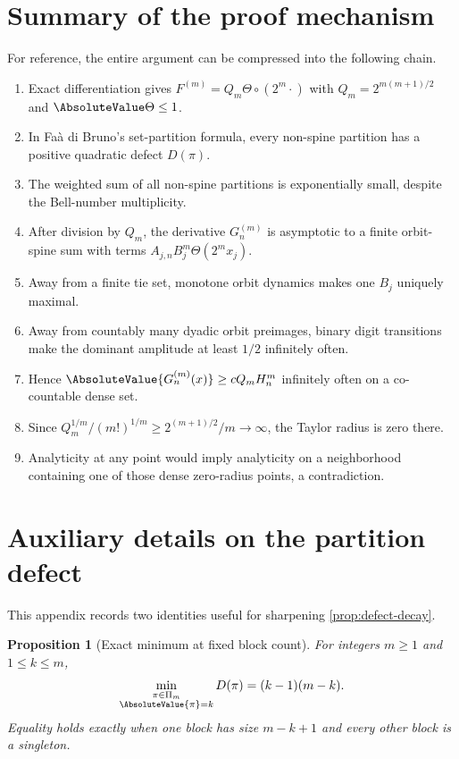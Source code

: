 \documentclass[11pt,oneside]{article}
\newtheorem{proposition}[theorem]{Proposition}
\theoremstyle{definition}
\theoremstyle{remark}
\newcommand{\comp}{\mathbin{\circ}}
\newcommand{\ThetaF}{\Theta}
\begin{document}
\section{Summary of the proof mechanism}

For reference, the entire argument can be compressed into the following chain.
\begin{enumerate}[label=\arabic*.]
 \item Exact differentiation gives $F^{(m)}=Q_m\ThetaF\comp(2^m\cdot)$ with
 $Q_m=2^{m(m+1)/2}$ and $\AbsoluteValue\ThetaF\leq1$.
 \item In Fa\`a di Bruno's set-partition formula, every non-spine partition has a
 positive quadratic defect $D(\pi)$.
 \item The weighted sum of all non-spine partitions is exponentially small, despite
 the Bell-number multiplicity.
 \item After division by $Q_m$, the derivative $G_n^{(m)}$ is asymptotic to a finite
 orbit-spine sum with terms $A_{j,n}B_j^m\ThetaF(2^m x_j)$.
 \item Away from a finite tie set, monotone orbit dynamics makes one $B_j$ uniquely
 maximal.
 \item Away from countably many dyadic orbit preimages, binary digit transitions make
 the dominant amplitude at least $1/2$ infinitely often.
 \item Hence $\AbsoluteValue{G_n^{(m)}(x)}\geq cQ_mH_n^m$ infinitely often on a co-countable
 dense set.
 \item Since $Q_m^{1/m}/(m!)^{1/m}\geq2^{(m+1)/2}/m\to\infty$, the Taylor radius is
 zero there.
 \item Analyticity at any point would imply analyticity on a neighborhood containing
 one of those dense zero-radius points, a contradiction.
\end{enumerate}

\appendix

\section{Auxiliary details on the partition defect}
\label{app:defect}

This appendix records two identities useful for sharpening
\cref{prop:defect-decay}.

\begin{proposition}[Exact minimum at fixed block count]
\label{prop:fixed-k-minimum}
For integers $m\geq1$ and $1\leq k\leq m$,
\begin{equation}
 \min_{\substack{\pi\in\Pi_m\\\AbsoluteValue{\pi}=k}}D(\pi)=(k-1)(m-k).
 \label{eq:fixed-k-minimum}
\end{equation}
Equality holds exactly when one block has size $m-k+1$ and every other block is a
singleton.
\end{proposition}
\end{document}
